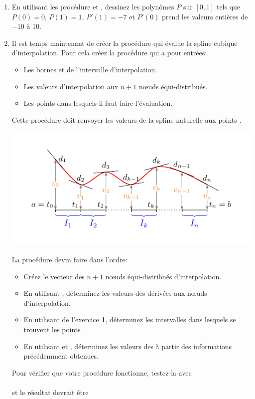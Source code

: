 \documentclass[a4paper,12pt,reqno]{amsart}
\begin{document}
\begin{exo}
\begin{enumerate}
    \item En utilisant les procédure  et , dessinez les polynômes $P$ sur $[0,1]$ tels que $P(0)=0$, $P(1)=1$, $P'(1)=-7$ et $P'(0)$ prend les valeurs entières de $-10$ à $10$.

    \item Il est temps maintenant de créer la procédure qui évalue la spline cubique d'interpolation. Pour cela créez la procédure  qui a pour entrées:
    \begin{itemize}
      \item Les bornes  et  de l'intervalle d'interpolation.

      \item Les valeurs  d'interpolation aux  $n+1$ nœuds équi-distribués.

      \item Les points  dans lesquels il faut faire l'évaluation.
    \end{itemize}
    Cette procédure doit renvoyer les valeurs  de la spline naturelle aux points .

    \begin{center}
      \includegraphics[width=15cm]{CubbicSpline}
    \end{center}

    La procédure  devra faire dans l'ordre:
    \begin{itemize}
       \item Créez le vecteur  des $n+1$ nœuds équi-distribués d'interpolation.
       \item En utilisant , déterminez les valeurs des dérivées aux nœuds d'interpolation.
       \item En utilisant  de l'exercice \textbf{1}, déterminez les intervalles dans lesquels se trouvent les points .
       \item En utilisant  et , déterminez les valeurs des  à partir des informations précédemment obtenues.
     \end{itemize}
     Pour vérifier que votre procédure fonctionne, testez-la avec\\
     \indent {}\\
     et le résultat devrait être\\
     \indent {}


\end{enumerate}
\end{exo}
\end{document}
